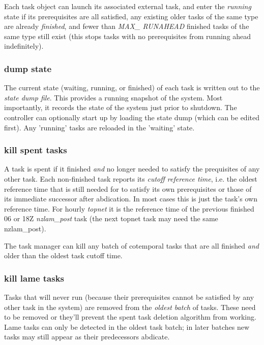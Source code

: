 \documentclass[11pt,a4paper]{report}
\begin{document}
Each task object can launch its associated external task, and enter the
{\em running} state if its prerequisites are all satisfied, any existing
older tasks of the same type are already {\em finished}, and fewer than
{\em MAX\_ RUNAHEAD} finished tasks of the same type still exist (this
stops tasks with no prerequisites from running ahead indefinitely).

\subsubsection{dump state} 

The current state (waiting, running, or finished) of each task is
written out to the {\em state dump file}.  This provides a running
snapshot of the system. Most importantly, it records the state of the
system just prior to shutdown. The controller can optionally start up
by loading the state dump (which can be edited first). Any 'running'
tasks are reloaded in the 'waiting' state.

\subsubsection{kill spent tasks} 

A task is spent if it finished {\em and} no longer needed to satisfy the
prequisites of any other task. Each non-finished task reports its {\em
cutoff reference time}, i.e. the oldest reference time that is still
needed for to satisfy its own prerequisites or those of its immediate
successor after abdication.  In most cases this is just the task's own
reference time. For hourly {\em topnet} it is the reference time of the
previous finished 06 or 18Z {\em nzlam\_post} task (the next topnet task
may need the same nzlam\_post).  

The task manager can kill any batch of cotemporal tasks that are all
finished {\em and} older than the oldest task cutoff time.

\subsubsection{kill lame tasks} 

Tasks that will never run (because their prerequisites cannot be
satisfied by any other task in the system) are removed from the {\em
oldest batch} of tasks.  These need to be removed or they'll prevent the
spent task deletion algorithm from working. Lame tasks can only be
detected in the oldest task batch; in later batches new tasks may still
appear as their predecessors abdicate.
\end{document}
